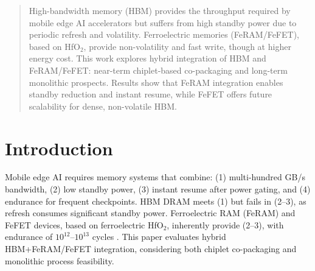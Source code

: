 \begin{abstract}
High-bandwidth memory (HBM) provides the throughput required by mobile edge AI accelerators but suffers from high standby power due to periodic refresh and volatility. 
Ferroelectric memories (FeRAM/FeFET), based on HfO$_2$, provide non-volatility and fast write, though at higher energy cost. 
This work explores hybrid integration of HBM and FeRAM/FeFET: near-term chiplet-based co-packaging and long-term monolithic prospects. 
Results show that FeRAM integration enables standby reduction and instant resume, while FeFET offers future scalability for dense, non-volatile HBM.
\end{abstract}

\section{Introduction}
Mobile edge AI requires memory systems that combine:
(1) multi-hundred GB/s bandwidth, 
(2) low standby power, 
(3) instant resume after power gating, 
and (4) endurance for frequent checkpoints.
HBM DRAM meets (1) but fails in (2--3), as refresh consumes significant standby power. 
Ferroelectric RAM (FeRAM) and FeFET devices, based on ferroelectric HfO$_2$, inherently provide (2--3), with endurance of $10^{12}$–$10^{13}$ cycles \cite{MuellerIEDM2012,MartinVLSI2020}. 
This paper evaluates hybrid HBM+FeRAM/FeFET integration, considering both chiplet co-packaging and monolithic process feasibility.
